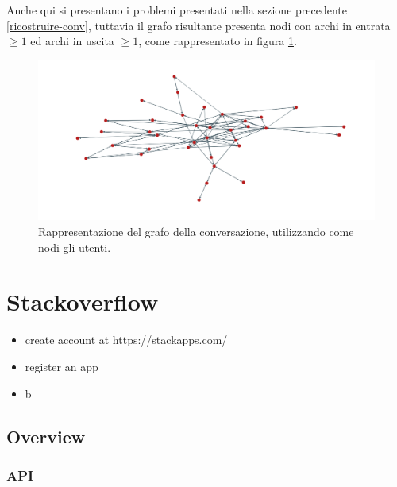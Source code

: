Anche qui si presentano i problemi presentati nella sezione precedente \ref{ricostruire-conv}, tuttavia il grafo risultante presenta nodi con archi in entrata $\geq 1$ ed archi in uscita $\geq 1$, come rappresentato in figura \ref{fig:users-twitter}.

\begin{figure}[ht]
    \includegraphics[width=\linewidth]{Immagini/twitter-users.png}
    \caption{Rappresentazione del grafo della conversazione, utilizzando come nodi gli utenti.}
    \label{fig:users-twitter}
\end{figure}





\section {Stackoverflow} %

\begin{itemize}
    \item create account at https://stackapps.com/
    \item register an app
    \item b
\end{itemize}

\subsection {Overview}
\subsubsection {API}

